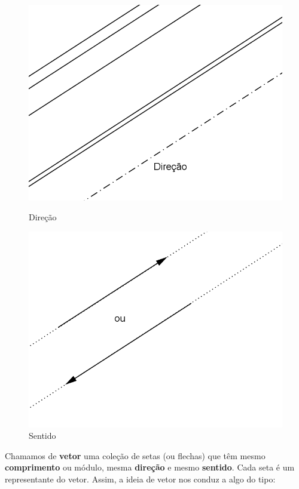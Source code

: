\begin{figure}[H]
\begin{minipage}[b]{0.37\linewidth}
\includegraphics[width=\linewidth]{analitica/imagens/vetor1.png}
\caption{Direção}
\label{fig:direcao}
\end{minipage} \hfill
\begin{minipage}[b]{0.37\linewidth}
\includegraphics[width=\linewidth]{analitica/imagens/vetor2.png}
\caption{Sentido}
\label{fig:direc}
\end{minipage}
\end{figure}

Chamamos de \textbf{vetor} uma coleção de setas (ou flechas) que têm mesmo \textbf{comprimento} ou módulo, mesma \textbf{direção} e mesmo \textbf{sentido}. Cada seta é um representante do vetor. Assim, a ideia de vetor nos conduz a algo do tipo:


